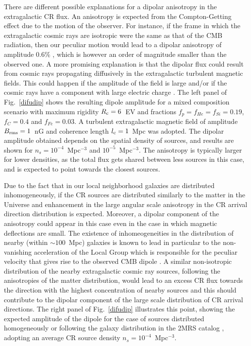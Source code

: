 \documentclass[twoside,12pt]{article}
\begin{document}
 There are different possible explanations for a dipolar anisotropy in the extragalactic CR flux. An anisotropy is expected from the Compton-Getting effect due to the motion of the observer. For instance, if the frame in which the extragalactic cosmic rays are isotropic were the same as that of the CMB radiation, then our peculiar motion would lead to a dipolar anisotropy of amplitude 0.6\%  \cite{ks06}, which is however an order of magnitude smaller than the observed one. A more promising explanation is that the dipolar flux could result from cosmic rays propagating diffusively in the extragalactic turbulent magnetic fields. This could happen  if the amplitude of the field is large and/or if the cosmic rays have a component with large electric charge \cite{ha14,hmr15}. The left panel of Fig.~\ref{difudip} shows the resulting dipole amplitude for a mixed composition scenario with maximum rigidity $R_{\rm c}=6$~EV and fractions $f_p = f_{He} =
f_{Si} = 0.19$, $f_{C} = 0.4$ and $f_{Fe} = 0.03$. A turbulent extragalactic magnetic field of amplitude $B_{\rm rms}=1$~nG and coherence length $l_{\rm c}=1$~Mpc was adopted. The dipolar amplitude obtained depends on the spatial density of sources, and results are shown for $n_s=10^{-4}$~Mpc$^{-3}$ and $10^{-5}$~Mpc$^{-3}$. The anisotropy is typically larger for lower densities, as the total flux gets shared between less sources in this case, and is expected to point towards the closest sources. 

 Due to the fact that in our local neighborhood galaxies are distributed inhomogeneously,  if the CR sources are distributed similarly to the matter in the Universe and enhancement in the large angular scale anisotropy in the CR arrival direction distribution is expected. Moreover, a dipolar component of the anisotropy could appear in this case even in the case in which magnetic deflections are small. The existence of inhomeogeneities in the distribution of nearby (within $\sim 100$~Mpc) galaxies is known to lead in particular to the non-vanishing acceleration of the Local Group which is responsible for the peculiar velocity that gives rise to the observed CMB dipole \cite{erdogdu06}. A similar non-isotropic distribution of the nearby extragalactic cosmic ray sources, following the anisotropies of the matter distribution,  would lead to an excess CR flux towards the direction with the highest concentration of nearby sources and this should contribute to the dipolar component of the large scale distribution of CR arrival directions.
The right panel of Fig.~\ref{difudip} illustrates this point, showing the expected amplitude of the dipole for the case of sources distributed homogeneously or following the galaxy distribution in the 2MRS catalog \cite{hu12}, adopting an average CR source density $n_s=10^{-4}$~Mpc$^{-3}$.
\end{document}
